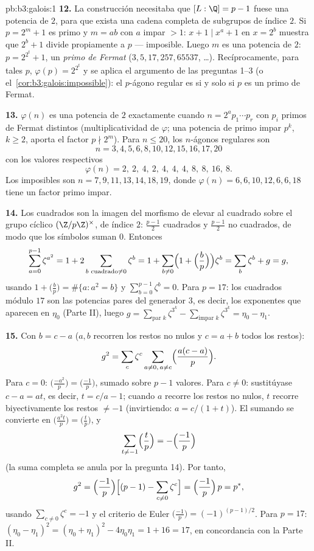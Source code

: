 \begin{solution}{pb:b3:galois:1}
\textbf{12.} La construcción necesitaba que $[L:\Q] = p - 1$ fuese una
potencia de $2$, para que exista una cadena completa de subgrupos de
índice $2$. Si $p = 2^m + 1$ es primo y $m = ab$ con $a$ impar $>
1$: $x + 1 \mid x^a + 1$ en $x = 2^b$ muestra que $2^b + 1$ divide
propiamente a $p$ --- imposible. Luego $m$ es una potencia de $2$: $p =
2^{2^t} + 1$, un \emph{primo de Fermat} ($3, 5, 17, 257, 65537$, \dots).
Recíprocamente, para tales $p$, $\varphi(p) = 2^{2^t}$ y se aplica el
argumento de las preguntas 1--3 (o el~\cref{cor:b3:galois:impossible}):
el $p$-ágono regular es
 si y solo si $p$ es un
primo de Fermat.

\textbf{13.} $\varphi(n)$ es una potencia de $2$ exactamente cuando $n =
2^a p_1\cdots p_r$ con $p_i$ primos de Fermat distintos
(multiplicatividad de $\varphi$; una potencia de primo impar $p^k$, $k
\geq 2$, aporta el factor $p \nmid 2^m$). Para $n \leq
20$, los $n$-ágonos regulares
 son
\[
n = 3, 4, 5, 6, 8, 10, 12, 15, 16, 17, 20
\]
con los valores respectivos
\[
\varphi(n) = 2,\ 2,\ 4,\ 2,\ 4,\ 4,\ 4,\ 8,\ 8,\ 16,\ 8 .
\]
Los imposibles son $n = 7, 9, 11, 13, 14, 18, 19$, donde
$\varphi(n) = 6, 6, 10, 12, 6, 6, 18$ tiene un factor primo impar.

\textbf{14.} Los cuadrados son la imagen del morfismo de elevar al
cuadrado sobre el grupo cíclico $(\Z/p\Z)^\times$, de índice $2$:
$\frac{p-1}2$ cuadrados y $\frac{p-1}2$ no cuadrados, de modo que los
símbolos suman $0$. Entonces
\[
\sum_{a=0}^{p-1}\zeta^{a^2} = 1 + 2\sum_{b \text{ cuadrado}
\neq 0}\zeta^b
= 1 + \sum_{b\neq0}\Bigl(1 + \Bigl(\frac bp\Bigr)\Bigr)
\zeta^b = \sum_{b}\zeta^b + g = g,
\]
usando $1 + \bigl(\frac bp\bigr) = \#\{a : a^2 = b\}$ y
$\sum_{b=0}^{p-1}\zeta^b = 0$. Para $p = 17$: los cuadrados módulo $17$
son las potencias pares del generador $3$, es decir, los exponentes que
aparecen en $\eta_0$ (Parte II), luego $g =
\sum_{\text{par }k}\zeta^{3^k} - \sum_{\text{impar }k}
\zeta^{3^k} = \eta_0 - \eta_1$.

\textbf{15.} Con $b = c - a$ ($a, b$ recorren los restos no nulos y
$c = a + b$ todos los restos):
\[
g^2 = \sum_c\zeta^c\sum_{a\neq0,\,a\neq c}
\Bigl(\frac{a(c-a)}p\Bigr) .
\]
Para $c = 0$: $\bigl(\frac{-a^2}p\bigr) =
\bigl(\frac{-1}p\bigr)$, sumado sobre $p - 1$ valores. Para $c \neq 0$:
sustitúyase $c - a = at$, es decir, $t = c/a -
1$; cuando $a$ recorre los restos no nulos, $t$ recorre biyectivamente
los restos $\neq -1$ (invirtiendo: $a = c/(1 +
t)$). El sumando se convierte en $\bigl(\frac{a^2t}p\bigr) =
\bigl(\frac tp\bigr)$, y
\[
\sum_{t \neq -1}\Bigl(\frac tp\Bigr)
= -\Bigl(\frac{-1}p\Bigr)
\]
(la suma completa se anula por la pregunta 14). Por tanto,
\[
g^2 = \Bigl(\frac{-1}p\Bigr)\Bigl[(p-1) -
\sum_{c\neq0}\zeta^c\Bigr]
= \Bigl(\frac{-1}p\Bigr)\,p = p^* ,
\]
usando $\sum_{c\neq0}\zeta^c = -1$ y el criterio de Euler
$\bigl(\frac{-1}p\bigr) = (-1)^{(p-1)/2}$. Para $p = 17$:
$(\eta_0 - \eta_1)^2 = (\eta_0 + \eta_1)^2 - 4\eta_0\eta_1 =
1 + 16 = 17$, en concordancia con la Parte II.


\end{solution}
